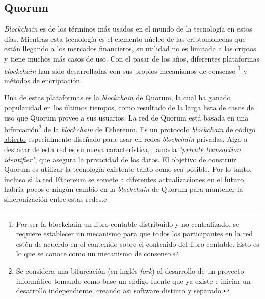   \subsection{Quorum} \hspace*{}

    \textit{Blockchain} es de los términos más usados en el mundo de la tecnología en estos días. Mientras esta tecnología es el elemento núcleo 
    de las criptomonedas que están llegando a los mercados financieros, su utilidad no es limitada a las criptos y tiene muchos más casos 
    de uso. Con el pasar de los años, diferentes plataformas \textit{blockchain} han sido desarrolladas con sus propios mecanismos de consenso
    \footnote{Por ser la blockchain un libro contable distribuido y no centralizado, se requiere establecer un mecanismo para que todos 
    los participantes en la red estén de acuerdo en el contenido sobre el contenido del libro contable. Esto es lo que se conoce 
    como un mecanismo de consenso.} y 
    métodos de encriptación.

    Una de estas plataformas es la \textit{blockchain} de Quorum, la cual ha ganado popularidad en los últimos tiempos, como resultado de 
    la larga
    lista de casos de uso que Quorum provee a sus usuarios. La red de Quorum está basada en una bifurcación\footnote{Se considera una 
    bifurcación (en inglés \textit{fork}) al desarrollo de un proyecto informático tomando como base un código fuente que ya existe e 
    iniciar un desarrollo independiente, creando asi software distinto y separado.} de la \textit{blockchain} de Ethereum.
    Es un protocolo \textit{blockchain} de \href{https://github.com/ConsenSys/quorum}{código abierto} especialmente diseñado para usar en redes 
    \textit{blockchain} privadas. Algo a destacar de esta red
    es su nueva característica, llamada \textit{"private transaction identifier"}, que asegura la privacidad de los datos. El objetivo de
    construir Quorum es utilizar la tecnología existente tanto como sea posible. Por lo tanto, incluso si la red Ethereum se somete a 
    diferentes actualizaciones en el futuro, habría pocos o ningún cambio en la \textit{blockchain} de Quorum para mantener la sincronización entre
    estas redes.e


